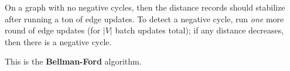 On a graph with no negative cycles, then the distance records should stabilize after running a ton of edge updates. To detect a negative cycle, run \emph{one} more round of edge updates (for \(\left|V\right|\) batch updates total); if any distance decreases, then there is a negative cycle.

This is the \textbf{Bellman-Ford} algorithm.